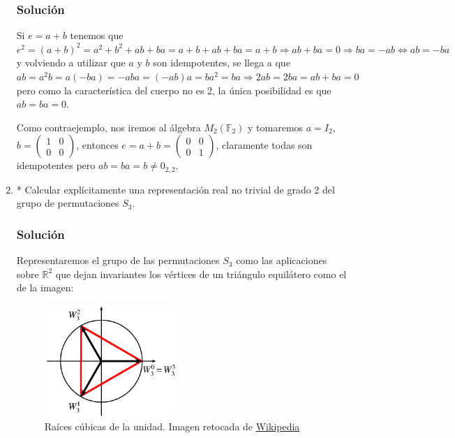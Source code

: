 \documentclass[paper=a4, fontsize=11pt, spanish]{scrartcl}
\begin{document}
\begin{enumerate}
		\subsubsection*{Solución}
		Si $e = a+b$ tenemos que $e^2 = (a+b)^2 = a^2 + b^2 + ab + ba = a + b + ab + ba = a+b \Rightarrow ab + ba
		= 0 \Rightarrow ba = -ab \Leftrightarrow ab = -ba$ y volviendo a utilizar que $a$ y $b$ son idempotentes,
		se llega a que $ab = a^2b = a(-ba) = -aba = (-ab)a = ba^2 = ba \Rightarrow 2ab = 2ba = ab + ba = 0$ pero
		como la característica del cuerpo no es 2, la única posibilidad es que $ab = ba = 0$.
		
		Como contraejemplo, nos iremos al álgebra $M_2(\mathbb{F}_2)$ y tomaremos $a = I_2$, $\displaystyle b =
		\begin{pmatrix} 1 & 0 \\ 0 & 0 \end{pmatrix}$, entonces $\displaystyle e = a+b = \begin{pmatrix} 0 & 0
		\\ 0 & 1 \end{pmatrix}$, claramente todas son idempotentes pero $ab = ba = b \neq 0_{2,2}$.
	
		\item * Calcular explícitamente una representación real no trivial de grado 2 del grupo de permutaciones
		$S_3$.
		\subsubsection*{Solución}
		Representaremos el grupo de las permutaciones $S_3$ como las aplicaciones sobre $\mathbb{R}^2$ que dejan
		invariantes los vértices de un triángulo equilátero como el de la imagen:
		
		\begin{figure}[H]
			\centering
			\includegraphics[width=5cm]{./3rd-roots-of-unity.png}
			\caption{Raíces cúbicas de la unidad. Imagen retocada de
			\href{https://upload.wikimedia.org/wikipedia/commons/3/3a/3rd-roots-of-unity.png}{Wikipedia}}
		\end{figure}
		

\end{enumerate}
\end{document}
